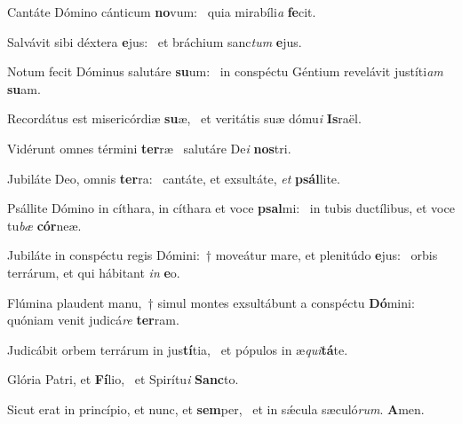 \item Cantáte Dómino cánticum \textbf{no}vum:~\psstar{} quia mirabíli\textit{a} \textbf{fe}cit.
\item Salvávit sibi déxtera \textbf{e}jus:~\psstar{} et bráchium sanc\textit{tum} \textbf{e}jus.
\item Notum fecit Dóminus salutáre \textbf{su}um:~\psstar{} in conspéctu Géntium revelávit justíti\textit{am} \textbf{su}am.
\item Recordátus est misericórdiæ \textbf{su}æ,~\psstar{} et veritátis suæ dómu\textit{i} \textbf{Is}raël.
\item Vidérunt omnes términi \textbf{ter}ræ~\psstar{} salutáre De\textit{i} \textbf{nos}tri.
\item Jubiláte Deo, omnis \textbf{ter}ra:~\psstar{} cantáte, et exsultáte, \textit{et} \textbf{psál}lite.
\item Psállite Dómino in cíthara, in cíthara et voce \textbf{psal}mi:~\psstar{} in tubis ductílibus, et voce tu\textit{bæ} \textbf{cór}neæ.
\item Jubiláte in conspéctu regis Dómini:~† moveátur mare, et plenitúdo \textbf{e}jus:~\psstar{} orbis terrárum, et qui hábitant \textit{in} \textbf{e}o.
\item Flúmina plaudent manu,~† simul montes exsultábunt a conspéctu \textbf{Dó}mini:~\psstar{} quóniam venit judicá\textit{re} \textbf{ter}ram.
\item Judicábit orbem terrárum in jus\textbf{tí}tia,~\psstar{} et pópulos in æ\textit{qui}\textbf{tá}te.
\item Glória Patri, et \textbf{Fí}lio,~\psstar{} et Spirítu\textit{i} \textbf{Sanc}to.
\item Sicut erat in princípio, et nunc, et \textbf{sem}per,~\psstar{} et in sǽcula sæculó\textit{rum}. \textbf{A}men.